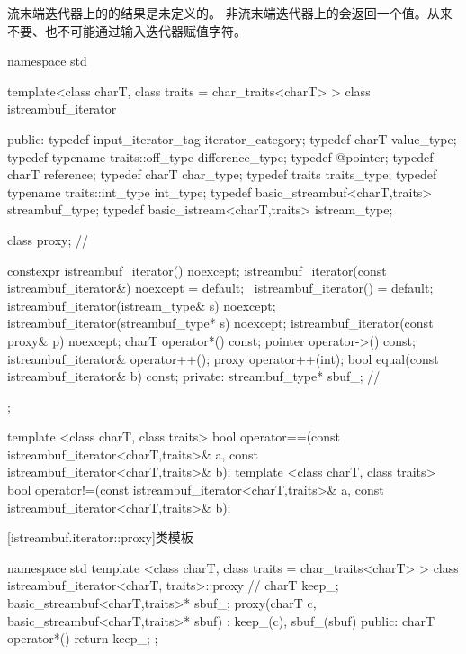 \pnum
流末端迭代器上的的结果是未定义的。%
非流末端迭代器上的会返回一个值。从来不要、也不可能通过输入迭代器赋值字符。

%
\begin{codeblock}
namespace std {
  template<class charT, class traits = char_traits<charT> >
  class istreambuf_iterator {
  public:
    typedef input_iterator_tag            iterator_category;
    typedef charT                         value_type;
    typedef typename traits::off_type     difference_type;
    typedef @\unspecnc@                   pointer;
    typedef charT                         reference;
    typedef charT                         char_type;
    typedef traits                        traits_type;
    typedef typename traits::int_type     int_type;
    typedef basic_streambuf<charT,traits> streambuf_type;
    typedef basic_istream<charT,traits>   istream_type;

    class proxy;                          // \expos

    constexpr istreambuf_iterator() noexcept;
    istreambuf_iterator(const istreambuf_iterator&) noexcept = default;
    ~istreambuf_iterator() = default;
    istreambuf_iterator(istream_type& s) noexcept;
    istreambuf_iterator(streambuf_type* s) noexcept;
    istreambuf_iterator(const proxy& p) noexcept;
    charT operator*() const;
    pointer operator->() const;
    istreambuf_iterator& operator++();
    proxy operator++(int);
    bool equal(const istreambuf_iterator& b) const;
  private:
    streambuf_type* sbuf_;                // \expos
  };

  template <class charT, class traits>
    bool operator==(const istreambuf_iterator<charT,traits>& a,
            const istreambuf_iterator<charT,traits>& b);
  template <class charT, class traits>
    bool operator!=(const istreambuf_iterator<charT,traits>& a,
            const istreambuf_iterator<charT,traits>& b);
}
\end{codeblock}

[istreambuf.iterator::proxy]{类模板}

%
\begin{codeblock}
namespace std {
  template <class charT, class traits = char_traits<charT> >
  class istreambuf_iterator<charT, traits>::proxy { // \expos
    charT keep_;
    basic_streambuf<charT,traits>* sbuf_;
    proxy(charT c, basic_streambuf<charT,traits>* sbuf)
      : keep_(c), sbuf_(sbuf) { }
  public:
    charT operator*() { return keep_; }
  };
}
\end{codeblock}

